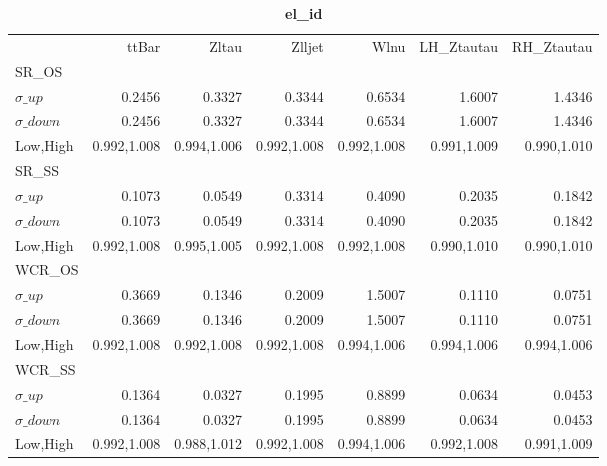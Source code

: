 \documentclass[11pt,oneside,a4paper]{article}
\begin{document}
\begin{table}
\centering
\caption{\bf{el\_id}}
\begin{tabular}{lrrrrrr}
& ttBar & Zltau & Zlljet & Wlnu & LH\_Ztautau & RH\_Ztautau \\
SR\_OS &  &  &  &  &  &  \\
$\sigma\_up$ & 0.2456 & 0.3327 & 0.3344 & 0.6534 & 1.6007 & 1.4346 \\
$\sigma\_down$ & 0.2456 & 0.3327 & 0.3344 & 0.6534 & 1.6007 & 1.4346 \\
Low,High & 0.992,1.008 & 0.994,1.006 & 0.992,1.008 & 0.992,1.008 & 0.991,1.009 & 0.990,1.010 \\

\hline
SR\_SS &  &  &  &  &  &  \\
$\sigma\_up$ & 0.1073 & 0.0549 & 0.3314 & 0.4090 & 0.2035 & 0.1842 \\
$\sigma\_down$ & 0.1073 & 0.0549 & 0.3314 & 0.4090 & 0.2035 & 0.1842 \\
Low,High & 0.992,1.008 & 0.995,1.005 & 0.992,1.008 & 0.992,1.008 & 0.990,1.010 & 0.990,1.010 \\

\hline
WCR\_OS &  &  &  &  &  &  \\
$\sigma\_up$ & 0.3669 & 0.1346 & 0.2009 & 1.5007 & 0.1110 & 0.0751 \\
$\sigma\_down$ & 0.3669 & 0.1346 & 0.2009 & 1.5007 & 0.1110 & 0.0751 \\
Low,High & 0.992,1.008 & 0.992,1.008 & 0.992,1.008 & 0.994,1.006 & 0.994,1.006 & 0.994,1.006 \\

\hline
WCR\_SS &  &  &  &  &  &  \\
$\sigma\_up$ & 0.1364 & 0.0327 & 0.1995 & 0.8899 & 0.0634 & 0.0453 \\
$\sigma\_down$ & 0.1364 & 0.0327 & 0.1995 & 0.8899 & 0.0634 & 0.0453 \\
Low,High & 0.992,1.008 & 0.988,1.012 & 0.992,1.008 & 0.994,1.006 & 0.992,1.008 & 0.991,1.009 \\

\hline
\end{tabular}
\end{table}
\end{document}
